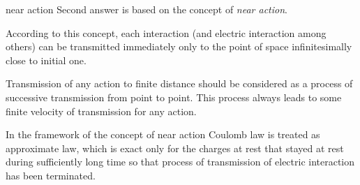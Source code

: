 \documentclass[10pt]{beamer}
\begin{document}
\begin{frame}[fragile]{near action}
Second answer is based on the concept of \alert{ {\it near action}}.

According to this concept, each interaction (and electric interaction
among others) can be transmitted immediately only to the point of
space infinitesimally close to initial one. 

Transmission of any action
to finite distance should be considered as a process of successive
transmission from point to point. This process always leads to
some \alert{finite velocity of transmission for any action}. 

In the framework
of the concept of near action \alert{Coulomb law is treated as
approximate law, which is exact only for the charges at rest } that
stayed at rest during sufficiently long time so that process of
transmission of electric interaction has been terminated.

\end{frame}
\end{document}
